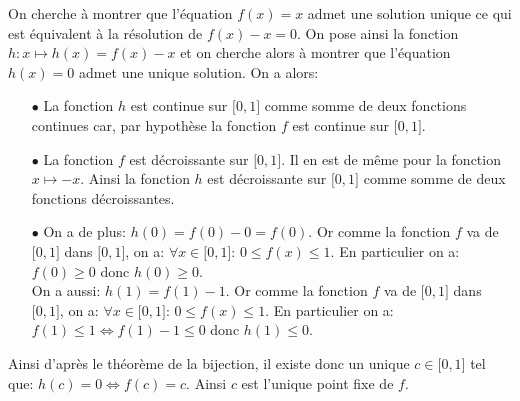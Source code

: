 \documentclass[a4paper, 11pt,reqno]{article}
\begin{document}
\begin{correction}
\begin{enumerate}
		      On cherche \`{a} montrer que l'\'equation $f(x)=x$ admet une solution unique ce qui est \'equivalent \`{a} la r\'esolution de $f(x)-x=0$. On pose ainsi la fonction $h: x\mapsto h(x)=f(x)-x$ et on cherche alors \`{a} montrer que l'\'equation $h(x)=0$ admet une unique solution. On a alors:
		      \begin{itemize}
			      \item[$\bullet$] La fonction $h$ est continue sur $\lbrack 0,1\rbrack$ comme somme de deux fonctions continues car, par hypoth\`{e}se la fonction $f$ est continue sur $\lbrack 0,1\rbrack$.
			      \item[$\bullet$] La fonction $f$ est d\'ecroissante sur $\lbrack 0,1\rbrack$. Il en est de m\^{e}me pour la fonction $x\mapsto -x$. Ainsi la fonction $h$ est d\'ecroissante sur $\lbrack 0,1\rbrack$ comme somme de deux fonctions d\'ecroissantes.
			      \item[$\bullet$] On a de plus: $h(0)=f(0)-0=f(0)$. Or comme la fonction $f$ va de $\lbrack 0,1\rbrack$ dans $\lbrack 0,1\rbrack$, on a: $\forall x\in\lbrack 0,1\rbrack$: $0\leq f(x)\leq 1$. En particulier on a: $f(0)\geq 0$ donc $h(0)\geq 0$.\\
			            \noindent On a aussi: $h(1)=f(1)-1$. Or comme la fonction $f$ va de $\lbrack 0,1\rbrack$ dans $\lbrack 0,1\rbrack$, on a: $\forall x\in\lbrack 0,1\rbrack$: $0\leq f(x)\leq 1$. En particulier on a: $f(1)\leq 1\Leftrightarrow f(1)-1\leq 0$ donc $h(1)\leq 0$.
		      \end{itemize}
		      Ainsi d'apr\`{e}s le th\'eor\`{e}me de la bijection, il existe donc un unique $c\in\lbrack 0,1\rbrack$ tel que: $h(c)=0\Leftrightarrow f(c)=c$. Ainsi $c$ est l'unique point fixe de $f$.
	\end{enumerate}
\end{correction}

\end{document}
